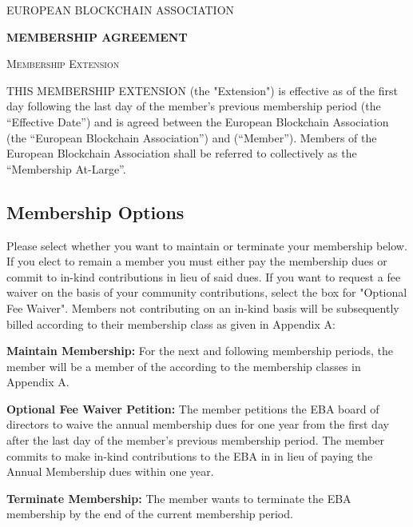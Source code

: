\documentclass{article}
\begin{document}


{\scshape\LARGE EUROPEAN BLOCKCHAIN ASSOCIATION \centering \par}
\vspace{0.4cm}
{\huge\bfseries MEMBERSHIP AGREEMENT \centering \par}
\vspace{0.4cm}
{\scshape\LARGE Membership Extension \centering \par}
\vspace{0.8cm}


THIS MEMBERSHIP EXTENSION (the "Extension") is effective as of the first day following the last day of the member's previous membership period (the “Effective Date”) and is agreed between the European Blockchain Association (the “European Blockchain Association”) and  (“Member”). Members of the European Blockchain Association shall be referred to collectively as the “Membership At-Large”. \\

\subsection*{Membership Options}
Please select whether you want to maintain or terminate your membership below.  If you elect to remain a member you must either pay the membership dues or commit to in-kind contributions in lieu of said dues. If you want to request a fee waiver on the basis of your community contributions, select the box for "Optional Fee Waiver". Members not contributing on an in-kind basis will be subsequently billed according to their membership class as given in Appendix A: \\ 

\begin{options}
    \item \textbf{Maintain Membership:} For the next and following membership periods, the member will be a member of the   according to the membership classes in Appendix A. \\
    \begin{options}
        \item \textbf{Optional Fee Waiver Petition:} The member petitions the EBA board of directors to waive the annual membership dues for one year from the first day after the last day of the member's previous membership period. The member commits to make in-kind contributions to the EBA in in lieu of paying the Annual Membership dues within one year. 
    \end{options}
    \item \textbf{Terminate Membership:} The member wants to terminate the EBA membership by the end of the current membership period.
\end{options}
\end{document}
